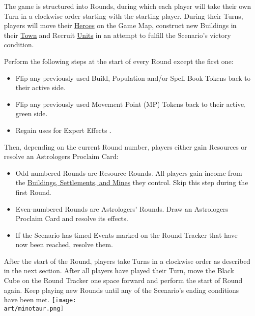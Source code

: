 
\begin{multicols*}{2}

The game is structured into Rounds, during which each player will take their own Turn in a clockwise order starting with the starting player.
During their Turns, players will move their \hyperlink{Heroes}{Heroes} on the Game Map, construct new Buildings in their \hyperlink{Town}{Town} and Recruit \hyperlink{Units}{Units} in an attempt to fulfill the Scenario's victory condition.\par
Perform the following steps at the start of every Round except the first one:
\begin{itemize}
  \item Flip any previously used Build, Population and/or Spell Book Tokens back to their active side.
  \item Flip any previously used Movement Point (MP) Tokens back to their active, green side.
  \item Regain uses for Expert Effects .
\end{itemize}
Then, depending on the current Round number, players either gain Resources or resolve an Astrologers Proclaim Card:
\begin{itemize}
  \item Odd-numbered Rounds are Resource Rounds.
    All players gain income from the \hyperlink{Mines}{Buildings, Settlements, and Mines} they control.
    Skip this step during the first Round.
  \item Even-numbered Rounds are Astrologers' Rounds.
    Draw an Astrologers Proclaim Card and resolve its effects.
  \item If the Scenario has timed Events marked on the Round Tracker that have now been reached, resolve them.
\end{itemize}
After the start of the Round, players take Turns in a clockwise order as described in the next section.
After all players have played their Turn, move the Black Cube on the Round Tracker one space forward and perform the start of Round again.
Keep playing new Rounds until any of the Scenario's ending conditions have been met.
\vfill
\hspace{2em}
\texttt{[image: \\art/minotaur.png]}
\vfill

\end{multicols*}
